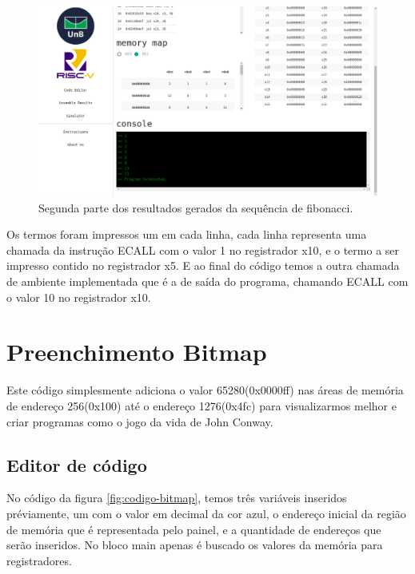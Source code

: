 	\begin{figure}[h]
	  \centering
	  \includegraphics[width=14cm]{img/fibonacci_results_2.png}
	  \caption{Segunda parte dos resultados gerados da sequência de fibonacci.}
	  \label{fig:fib-results-2}
	\end{figure}

	Os termos foram impressos um em cada linha, cada linha representa uma chamada da instrução ECALL com o valor 1 no registrador x10, e o termo a ser impresso contido no registrador x5. E ao final do código temos a outra chamada de ambiente implementada que é a de saída do programa, chamando ECALL com o valor 10 no registrador x10.


\section{Preenchimento Bitmap}

	Este código simplesmente adiciona o valor 65280(0x0000ff) nas áreas de memória de endereço 256(0x100) até o endereço 1276(0x4fc) para visualizarmos melhor e criar programas como o jogo da vida de John Conway.

\subsection{Editor de código}

	No código da figura \ref{fig:codigo-bitmap}, temos três variáveis inseridos préviamente, um com o valor em decimal da cor azul, o endereço inicial da região de memória que é representada pelo painel, e a quantidade de endereços que serão inseridos. No bloco main apenas é buscado os valores da memória para registradores.
	
